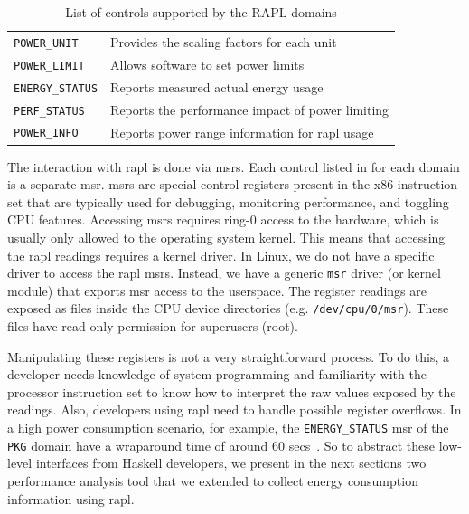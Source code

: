 \begin{table}[htp]
	\centering
	\caption{List of controls supported by the RAPL domains}
	\begin{tabular}{ll}
	  \toprule
		\texttt{POWER\_UNIT}    & Provides the scaling factors for each unit\\
		\texttt{POWER\_LIMIT}   & Allows software to set power limits\\
		\texttt{ENERGY\_STATUS} & Reports measured actual energy usage\\
		\texttt{PERF\_STATUS}   & Reports the performance impact of power limiting\\
		\texttt{POWER\_INFO}    & Reports power range information for \ac{rapl} usage\\
	  \bottomrule
	\end{tabular}
	\label{tbl:rapl-domains}
\end{table}

The interaction with \acs{rapl} is done via \acp{msr}. Each control listed in  for each domain is a separate \ac{msr}. \acp{msr} are special control registers present in the x86 instruction set that are typically used for debugging, monitoring performance, and toggling CPU features. Accessing \acp{msr} requires ring-0 access to the hardware, which is usually only allowed to the operating system kernel. This means that accessing the \ac{rapl} readings requires a kernel driver. In Linux, we do not have a specific driver to access the \ac{rapl} \acp{msr}. Instead, we have a generic \texttt{msr} driver (or kernel module) that exports \ac{msr} access to the userspace. The register readings are exposed as files inside the CPU device directories (e.g. \texttt{/dev/cpu/0/msr}). These files have read-only permission for superusers (root).

Manipulating these registers is not a very straightforward process. To do this, a developer needs knowledge of system programming and familiarity with the processor instruction set to know how to interpret the raw values exposed by the readings. Also, developers using \ac{rapl} need to handle possible register overflows. In a high power consumption scenario, for example, the \texttt{ENERGY\_STATUS} \ac{msr} of the \texttt{PKG} domain have a wraparound time of around 60 secs~\cite[p. 2465]{intel:2016}. So to abstract these low-level interfaces from Haskell developers, we present in the next sections two performance analysis tool that we extended to collect energy consumption information using \ac{rapl}.


